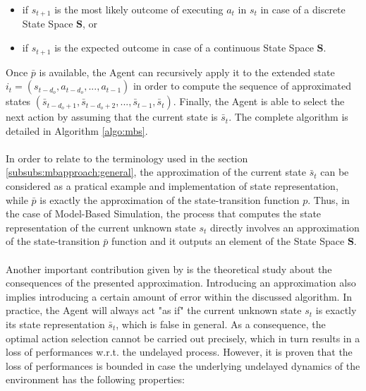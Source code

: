                 \begin{itemize}
                    \item if $s_{t+1}$ is the most likely outcome of executing $a_t$ in $s_t$ in case of a discrete State Space $\mathbf{S}$, or
                    \item if $s_{t+1}$ is the expected outcome in case of a continuous State Space $\mathbf{S}$.
                \end{itemize}
                
                Once $\bar{p}$ is available, the Agent can recursively apply it to the extended state $i_t = \left( s_{t-d_{o}}, a_{t-d_{o}},..., a_{t-1}\right)$ in order to compute the sequence of approximated states $(\bar{s}_{t-d_{o}+1}, \bar{s}_{t-d_{o}+2}, ..., \bar{s}_{t-1}, \bar{s}_{t})$. Finally, the Agent is able to select the next action by assuming that the current state is $\bar{s}_{t}$. The complete algorithm is detailed in Algorithm \ref{algo:mbs}.
                \\\\
                In order to relate to the terminology used in the section \ref{subsubs:mbapproach:general}, the approximation of the current state $\bar{s}_t$ can be considered as a pratical example and implementation of state representation, while $\bar{p}$ is exactly the approximation of the state-transition function $p$. Thus, in the case of Model-Based Simulation, the process that computes the state representation of the current unknown state $s_t$ directly involves an approximation of the state-transition $\bar{p}$ function and it outputs an element of the State Space $\mathbf{S}$.
                \\\\
                Another important contribution given by  is the theoretical study about the consequences of the presented approximation. Introducing an approximation also implies introducing a certain amount of error within the discussed algorithm. In practice, the Agent will always act "as if" the current unknown state $s_t$ is exactly its state representation $\bar{s}_{t}$, which is false in general. As a consequence, the optimal action selection cannot be carried out precisely, which in turn results in a loss of performances w.r.t. the undelayed process. However, it is proven that the loss of performances is bounded in case the underlying undelayed dynamics of the environment has the following properties:
                
